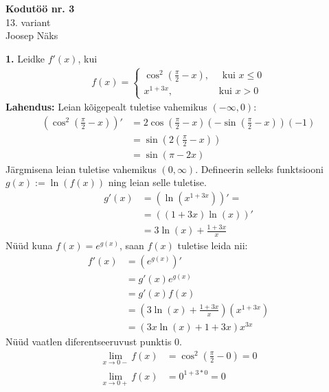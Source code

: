 \documentclass{article}
\begin{document}
\begin{center}
\Large\textbf{Kodut\"o\"o nr. 3}\\
13. variant\\
\small{Joosep N\"aks}
\end{center}
\textbf{1.} Leidke $f'(x)$, kui
\begin{equation*}
\begin{aligned}
f(x)=\left\{
\begin{gathered}
\cos^2\left(\frac{\pi}{2}-x\right),\quad\text{ kui }x\leq0\\
x^{1+3x},\qquad\qquad\ \ \text{ kui }x>0
\end{gathered}
\right.
\end{aligned}
\end{equation*}
\textbf{Lahendus:} Leian kõigepealt tuletise vahemikus $(-\infty,0)$:
\begin{equation*}
\begin{aligned}
\left(\cos^2\left(\frac{\pi}{2}-x\right)\right)'&=2\cos\left(\frac{\pi}{2}-x\right)\left(-\sin\left(\frac{\pi}{2}-x\right)\right)(-1)\\
&=\sin\left(2\left(\frac{\pi}{2}-x\right)\right)\\
&=\sin(\pi-2x)
\end{aligned}
\end{equation*}
J\"argmisena leian tuletise vahemikus $(0,\infty)$. Defineerin selleks funktsiooni $g(x):=\ln(f(x))$ ning leian selle tuletise.
\begin{equation*}
\begin{aligned}
g'(x)&=\left(\ln\left(x^{1+3x}\right)\right)'=\\
&=\left((1+3x)\ln(x)\right)'\\
&=3\ln(x)+\frac{1+3x}{x}
\end{aligned}
\end{equation*}
N\"u\"ud kuna $f(x)=e^{g(x)}$, saan $f(x)$ tuletise leida nii:
\begin{equation*}
\begin{aligned}
f'(x)&=\left(e^{g(x)}\right)'\\
&=g'(x)e^{g(x)}\\
&=g'(x)f(x)\\
&=\left(3\ln(x)+\frac{1+3x}{x}\right)\left(x^{1+3x}\right)\\
&=\left(3x\ln(x)+1+3x\right)x^{3x}
\end{aligned}
\end{equation*}
N\"u\"ud vaatlen diferentseeruvust punktis 0.
\begin{equation*}
\begin{aligned}
\lim_{x\to0-}f(x)&=\cos^2\left(\frac{\pi}{2}-0\right)=0\\
\lim_{x\to0+}f(x)&=0^{1+3*0}=0\\
\end{aligned}
\end{equation*}
\end{document}
